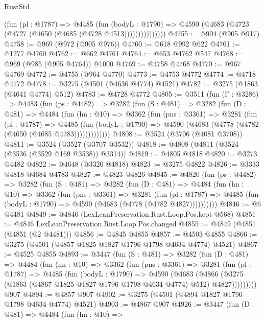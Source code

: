 \begin{lexlean}{RustStd}
\begin{coremodule}
                  (fun (pl : @1787) =>
                  @4485
                    (fun (bodyL : @1790) =>
                    @4590 (@4683 (@4723 (@4727 (@4650 (@4685 (@4728 @4513)))))))))))))))
@4755 := @904 (@905 @917)
@4758 := @969 (@972 (@905 @976))
@4760 := @618 @992 @622
@4761 := @1277 @4760
@4762 := @662 @4761
@4764 := @653 @4762 @547
@4768 := @969 (@985 (@905 @4764)) @1000
@4769 := @4758 @4768
@4770 := @967 @4769
@4772 := @4755 (@964 @4770)
@4773 := @4753 @4772
@4774 := @4718 @4772
@4778 := @3275 (@4501 (@4636 @4774) @4521)
@4782 := @3275 (@1863 (@4641 @4774) @512)
@4783 := @4728 @4772
@4805 := @3511
    (fun (Γ : @3286) =>
    @4483
      (fun (ps : @4482) =>
      @3282
        (fun (S : @481) =>
        @3282
          (fun (D : @481) =>
          @4484
            (fun (hn : @10) =>
            @3362
              (fun (pns : @3361) =>
              @3281
                (fun (pl : @1787) =>
                @4485
                  (fun (bodyL : @1790) =>
                  @4590 (@4683 (@4778 (@4782 (@4650 (@4685 @4783)))))))))))))
@4808 := @3524 (@3706 (@4081 @3708))
@4811 := @3524 (@3527 (@3707 @3532))
@4818 := @4808 (@4811 (@3524 (@3536 (@3529 @169 @3538)) @3314))
@4819 := @4805 @4818
@4820 := @3273 @4482
@4822 := @4648 (@3326 @4818)
@4823 := @3275 @4822
@4826 := @3333 @4818 @4684 @4783
@4827 := @4823 @4826
@4845 := @4820
    (fun (ps : @4482) =>
    @3282
      (fun (S : @481) =>
      @3282
        (fun (D : @481) =>
        @4484
          (fun (hn : @10) =>
          @3362
            (fun (pns : @3361) =>
            @3281
              (fun (pl : @1787) =>
              @4485 (fun (bodyL : @1790) => @4590 (@4683 (@4778 (@4782 @4827))))))))))
@4846 := @6 @4481
@4849 := @4846 (LexLeanPreservation.Rust.Loop.Pos.kept @568)
@4851 := @4846 LexLeanPreservation.Rust.Loop.Pos.changed
@4855 := @4849 (@4851 (@4851 (@2 @4481)))
@4856 := @4845 @4855
@4857 := @4503 @4855
@4866 := @3275 (@4501 (@4857 @1825 @1827 @1796 @1798 @4634 @4774) @4521)
@4867 := @4525 @4855
@4893 := @3447
    (fun (S : @481) =>
    @3282
      (fun (D : @481) =>
      @4484
        (fun (hn : @10) =>
        @3362
          (fun (pns : @3361) =>
          @3281
            (fun (pl : @1787) =>
            @4485
              (fun (bodyL : @1790) =>
              @4590
                (@4683
                  (@4866
                    (@3275 (@1863 (@4867 @1825 @1827 @1796 @1798 @4634 @4774) @512) @4827)))))))))
    @907
@4894 := @4857 @907
@4902 := @3275 (@4501 (@4894 @1827 @1796 @1798 @4634 @4774) @4521)
@4903 := @4867 @907
@4926 := @3447
    (fun (D : @481) =>
    @4484
      (fun (hn : @10) =>

\end{coremodule}
\end{lexlean}
